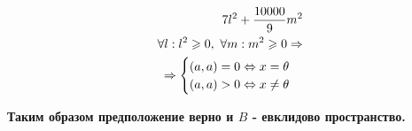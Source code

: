\begin{enumerate}
{\begin{align*}
          \mtxa l^2 + \mtxb m^2                                             \\
          \forall l:l^2 \geqslant 0,\ \forall m:m^2 \geqslant 0 \Rightarrow \\
          \Rightarrow
          \begin{cases}
            (a,a) = 0 \Leftrightarrow x = \theta \\
            (a,a) > 0 \Leftrightarrow x \ne \theta
          \end{cases}
        \end{align*}
        }
\end{enumerate}

\textbf{Таким образом предположение верно и $B$ - евклидово пространство.}